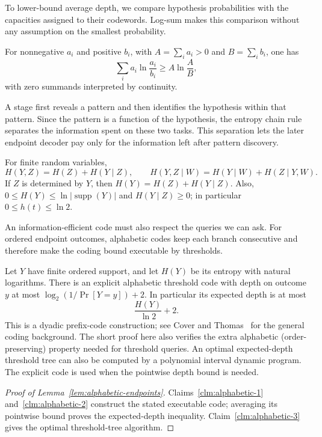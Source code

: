 To lower-bound average depth, we compare hypothesis probabilities
with the capacities assigned to their codewords. Log-sum makes this
comparison without any assumption on the smallest probability.

\begin{lemma}\label{lem:log-sum}
For nonnegative $a_i$ and positive $b_i$, with
$A=\sum_i a_i>0$ and $B=\sum_i b_i$, one has
\[
 \sum_i a_i\ln\frac{a_i}{b_i}\ge A\ln\frac AB,
\]
with zero summands interpreted by continuity.
\end{lemma}


A stage first reveals a pattern and then identifies the hypothesis
within that pattern. Since the pattern is a function of the hypothesis,
the entropy chain rule separates the information spent on these two
tasks. This separation lets the later endpoint decoder pay only for
the information left after pattern discovery.

\begin{lemma}\label{lem:entropy-chain-rule}
For finite random variables,
\[
 H(Y,Z)=H(Z)+H(Y\mid Z),\qquad
 H(Y,Z\mid W)=H(Y\mid W)+H(Z\mid Y,W).
\]
If $Z$ is determined by $Y$, then
$H(Y)=H(Z)+H(Y\mid Z)$. Also,
$0\le H(Y)\le\ln|\operatorname{supp}(Y)|$ and
$H(Y\mid Z)\ge0$; in particular $0\le h(t)\le\ln2$.
\end{lemma}


An information-efficient code must also respect the queries we can
ask. For ordered endpoint outcomes, alphabetic codes keep each branch
consecutive and therefore make the coding bound executable by thresholds.

\begin{lemma}\label{lem:alphabetic-endpoints}
Let $Y$ have finite ordered support, and let $H(Y)$ be its entropy
with natural logarithms. There is an explicit alphabetic threshold
code with depth on outcome $y$ at most
$\log_2(1/\Pr[Y=y])+2$.
In particular its expected depth is at most
\[
 \frac{H(Y)}{\ln2}+2.
\]
This is a dyadic prefix-code construction; see Cover and
Thomas~\cite{ct2006} for the general coding background. The short
proof here also verifies the extra alphabetic (order-preserving)
property needed for threshold queries.
An optimal expected-depth threshold tree can also be computed by
a polynomial interval dynamic program. The explicit code is used
when the pointwise depth bound is needed.
\end{lemma}
\begin{proof}[Proof of Lemma~\ref{lem:alphabetic-endpoints}]
Claims~\ref{clm:alphabetic-1} and~\ref{clm:alphabetic-2} construct
the stated executable code; averaging its pointwise bound proves
the expected-depth inequality. Claim~\ref{clm:alphabetic-3} gives
the optimal threshold-tree algorithm.
\end{proof}


